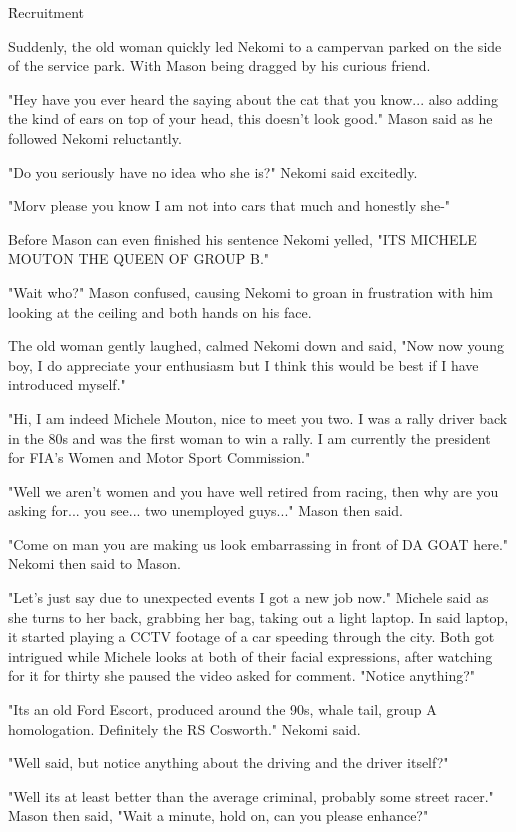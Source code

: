 \h{Recruitment}

Suddenly, the old woman quickly led Nekomi to a campervan parked on the side of the service park. With Mason being dragged by his curious friend. 

"Hey have you ever heard the saying about the cat that you know... also adding the kind of ears on top of your head, this doesn't look good." Mason said as he followed Nekomi reluctantly. 

"Do you seriously have no idea who she is?" Nekomi said excitedly. 

"Morv please you know I am not into cars that much and honestly she-"

Before Mason can even finished his sentence Nekomi yelled, "ITS MICHELE MOUTON THE QUEEN OF GROUP B."

"Wait who?" Mason confused, causing Nekomi to groan in frustration with him looking at the ceiling and both hands on his face. 

The old woman gently laughed, calmed Nekomi down and said, "Now now young boy, I do appreciate your enthusiasm but I think this would be best if I have introduced myself."

"Hi, I am indeed Michele Mouton, nice to meet you two. I was a rally driver back in the 80s and was the first woman to win a rally. I am currently the president for FIA's Women and Motor Sport Commission."

"Well we aren't women and you have well retired from racing, then why are you asking for... you see... two unemployed guys..." Mason then said. 

"Come on man you are making us look embarrassing in front of DA GOAT here." Nekomi then said to Mason. 

"Let's just say due to unexpected events I got a new job now." Michele said as she turns to her back, grabbing her bag, taking out a light laptop. In said laptop, it started playing a CCTV footage of a car speeding through the city. Both got intrigued while Michele looks at both of their facial expressions, after watching for it for thirty she paused the video asked for comment. "Notice anything?"

"Its an old Ford Escort, produced around the 90s, whale tail, group A homologation. Definitely the RS Cosworth." Nekomi said. 

"Well said, but notice anything about the driving and the driver itself?"

"Well its at least better than the average criminal, probably some street racer." Mason then said, "Wait a minute, hold on, can you please enhance?"

